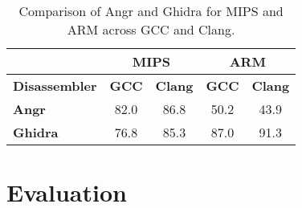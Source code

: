 \documentclass[seminar]{plai}
\begin{document}
\begin{table}[H]
\centering
\begin{tabular}{|l|c|c||c|c|}
\hline
 & \multicolumn{2}{c||}{\textbf{MIPS}} & \multicolumn{2}{c|}{\textbf{ARM}} \\
\hline
\textbf{Disassembler} & \textbf{GCC} & \textbf{Clang} & \textbf{GCC} & \textbf{Clang} \\
\hline
\textbf{Angr}   & 82.0 & 86.8 & 50.2 & 43.9 \\
\hline
\textbf{Ghidra} & 76.8 & 85.3 & 87.0 & 91.3 \\
\hline
\end{tabular}
\caption{Comparison of Angr and Ghidra for MIPS and ARM across GCC and Clang.}
\end{table}

\begin{table}[H]
\centering
{}
\caption{Comparison of Angr and Ghidra on Instruction Boundary and Function Boundary metrics.\cite{an-empirical-study-on-ARM-disassembly-disassembly-tools}}
\end{table}




\section{Evaluation}
\label{sec:evaluation}
\end{document}
